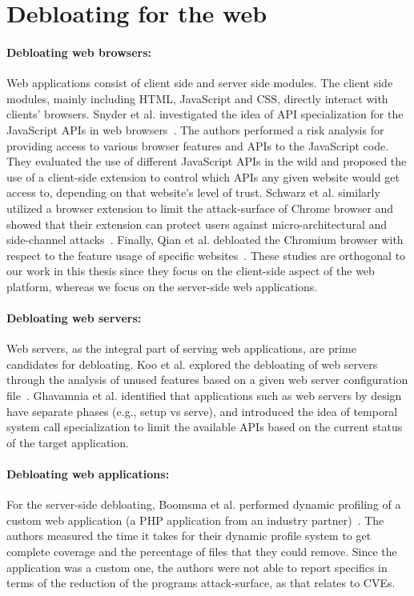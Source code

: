 \section{Debloating for the web}

\paragraph{Debloating web browsers:} Web applications consist of client side and server side modules. 
The client side modules, mainly including HTML, JavaScript and CSS, directly interact with clients' browsers. 
Snyder et al. investigated the idea of API specialization for the JavaScript APIs in web browsers~\cite{snyder2017vibrate}. 
The authors performed a risk analysis for providing access to various browser features and APIs to the JavaScript code.
They evaluated the use of different
JavaScript APIs in the wild and proposed the use of a client-side extension
to control which APIs any given website would get access to, depending
on that website's level of trust. 
Schwarz et al. similarly utilized a browser
extension to limit the attack-surface of Chrome browser and showed that their extension can protect users against micro-architectural and side-channel attacks~\cite{Schwarz2018}. 
Finally, Qian et al. debloated the Chromium browser with respect to the feature usage of specific websites~\cite{qian2020slimium}. 
These studies are orthogonal to our work in this thesis since
they focus on the client-side aspect of the web platform, whereas we focus on the server-side web applications. 

\paragraph{Debloating web servers:} Web servers, as the integral part of serving web applications, are prime candidates for debloating. 
Koo et al. explored the debloating of web servers through the analysis of unused features based on a given web server configuration file~\cite{koo2019configuration}. 
Ghavamnia et al. identified that applications such as web servers by design have separate phases (e.g., setup vs serve), and introduced the idea of temporal system call specialization to limit the available APIs based on the current status of the target application. 

\paragraph{Debloating web applications:} For the server-side debloating, Boomsma et al. performed dynamic profiling of a custom web application (a PHP application from an industry partner)~\cite{boomsma2012Dead}. 
The authors measured the time it takes for their dynamic profile system to get
complete coverage and the percentage of files that they could remove. Since the
application was a custom one, the authors were not able to report specifics
in terms of the reduction of the programs attack-surface, as that relates
to CVEs. 

